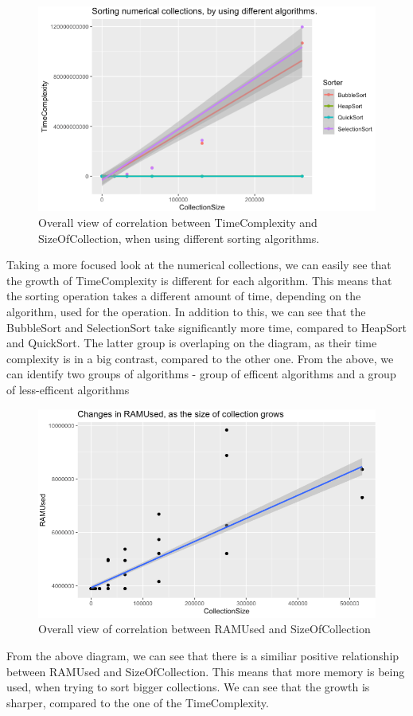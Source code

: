 \documentclass[]{report}
\begin{document}
				
		\begin{figure}[h]
			\centering
			\includegraphics[width=0.7\linewidth]{overallInts}
			\caption[Figure 3.3]{Overall view of correlation between TimeComplexity and SizeOfCollection, when using different sorting algorithms.}
		\end{figure}
		
		Taking a more focused look at the numerical collections, we can easily see that the growth of TimeComplexity is different for each algorithm. This means that the sorting operation takes a different amount of time, depending on the algorithm, used for the operation. In addition to this, we can see that the BubbleSort and SelectionSort take significantly more time, compared to HeapSort and QuickSort. The latter group is overlaping on the diagram, as their time complexity is in a big contrast, compared to the other one. From the above, we can identify two groups of algorithms - group of efficent algorithms and a group of less-efficent algorithms
		
		\begin{figure}[h]
		\centering
		\includegraphics[width=0.7\linewidth]{ramUsageSize}
		\caption[Figure 3.4]{Overall view of correlation between RAMUsed and SizeOfCollection}
	\end{figure}
	
	From the above diagram, we can see that there is a similiar positive relationship between RAMUsed and SizeOfCollection. This means that more memory is being used, when trying to sort bigger collections. We can see that the growth is sharper, compared to the one of the TimeComplexity.
\end{document}
